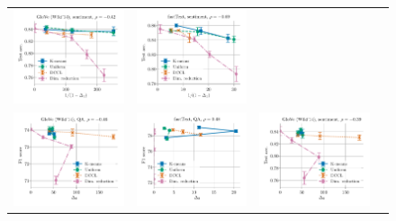 \begin{figure}
\begin{tabular}{@{\hskip -0.0in}c@{\hskip -0.0in}c@{\hskip -0.0in}c@{\hskip -0.0in}c@{\hskip -0.0in}}
		\includegraphics[width=.245\linewidth]{figures/glove400k_sentiment_sst_test-acc_vs_gram-large-dim-delta1-2-trans_linx_det.pdf} &
		\includegraphics[width=.245\linewidth]{figures/fasttext1m_sentiment_sst_test-acc_vs_gram-large-dim-delta1-2-trans_linx_det.pdf} \\
		\includegraphics[width=.245\linewidth]{figures/glove400k_qa_best-f1_vs_gram-large-dim-delta2-2_linx_det.pdf} &
		\includegraphics[width=.245\linewidth]{figures/fasttext1m_qa_best-f1_vs_gram-large-dim-delta2-2_linx_det.pdf} &
		\includegraphics[width=.245\linewidth]{figures/glove400k_sentiment_sst_test-acc_vs_gram-large-dim-delta2-2_linx_det.pdf} &

\end{tabular}
\end{figure}
